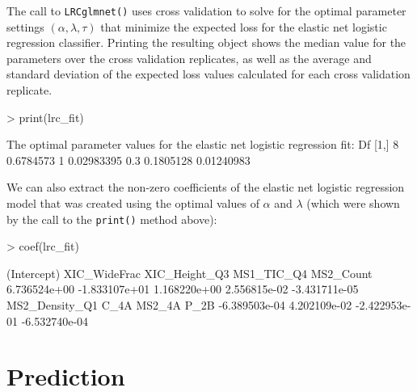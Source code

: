 \documentclass{article}
\begin{document}
\noindent The call to {\tt LRCglmnet()} uses cross validation to solve for the optimal parameter settings 
$\left(\alpha, \lambda, \tau\right)$ that minimize the expected loss for the elastic net logistic regression 
classifier. Printing the resulting object shows the median value for the parameters over the cross validation 
replicates, as well as the average and standard deviation of the expected loss values calculated for each
cross validation replicate.
 
\begin{Schunk}
\begin{Sinput}
> print(lrc_fit)
\end{Sinput}
\begin{Soutput}
The optimal parameter values for the elastic net logistic regression fit: 
     Df      %
[1,]  8 0.6784573     1 0.02983395 0.3         0.1805128      0.01240983
\end{Soutput}
\end{Schunk}

\noindent We can also extract the non-zero coefficients of the elastic net logistic regression 
model that was created using the optimal values of $\alpha$ and $\lambda$ (which were shown by 
the call to the {\tt print()} method above):
\begin{Schunk}
\begin{Sinput}
> coef(lrc_fit)
\end{Sinput}
\begin{Soutput}
   (Intercept)   XIC_WideFrac  XIC_Height_Q3     MS1_TIC_Q4      MS2_Count 
  6.736524e+00  -1.833107e+01   1.168220e+00   2.556815e-02  -3.431711e-05 
MS2_Density_Q1           C_4A         MS2_4A           P_2B 
 -6.389503e-04   4.202109e-02  -2.422953e-01  -6.532740e-04 
\end{Soutput}
\end{Schunk}

\section{Prediction}
\end{document}
